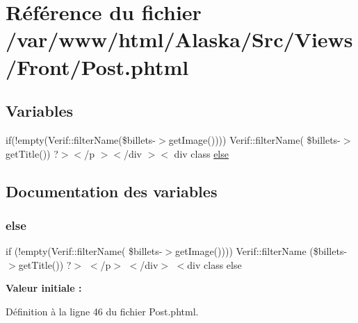 \hypertarget{_post_8phtml}{}\section{Référence du fichier /var/www/html/\+Alaska/\+Src/\+Views/\+Front/\+Post.phtml}
\label{_post_8phtml}
\subsection*{Variables}
\begin{DoxyCompactItemize}
\item 
if(!empty(Verif\+::filter\+Name(\$billets-\/$>$get\+Image()))) Verif\+::filter\+Name( \$billets-\/$>$get\+Title()) ?$>$$<$/p $>$$<$/div $>$$<$ div class \hyperlink{_post_8phtml_a1b3147c3812ec28a287cd73eb1d680d8}{else}
\end{DoxyCompactItemize}


\subsection{Documentation des variables}
\mbox{\label{_post_8phtml_a1b3147c3812ec28a287cd73eb1d680d8}} 
\subsubsection{\texorpdfstring{else}{else}}
{\footnotesize\ttfamily if (!empty(Verif\+::filter\+Name( \$billets-\/$>$get\+Image()))) Verif\+::filter\+Name (\$billets-\/$>$get\+Title()) ?$>$ $<$/p$>$ $<$/div$>$ $<$div class else}

{\bfseries Valeur initiale \+:}


Définition à la ligne 46 du fichier Post.\+phtml.

